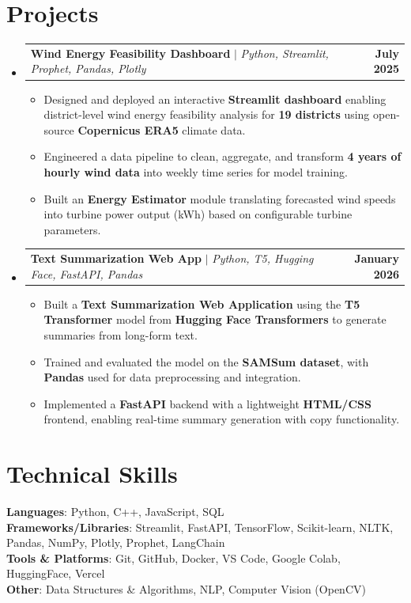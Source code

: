 \documentclass[letterpaper,11pt]{article}
\makeatletter
\newcommand{\resumeItem}[1]{
  \item\small{
    {#1 \vspace{-2pt}}
  }
}
\newcommand{\resumeProjectHeading}[2]{
    \item
    \begin{tabular*}{1.001\textwidth}{l@{\extracolsep{\fill}}r}
      \small#1 & \textbf{\small #2}\\
    \end{tabular*}\vspace{-7pt}
}
\newcommand{\resumeSubHeadingListStart}{\begin{itemize}[leftmargin=0.0in, label={}]}
\newcommand{\resumeSubHeadingListEnd}{\end{itemize}}
\newcommand{\resumeItemListStart}{\begin{itemize}}
\newcommand{\resumeItemListEnd}{\end{itemize}\vspace{-5pt}}
\makeatother
\begin{document}
\section{Projects}
    \vspace{-5pt}
    \resumeSubHeadingListStart
      \resumeProjectHeading
          {\textbf{Wind Energy Feasibility Dashboard} $|$ \emph{Python, Streamlit, Prophet, Pandas, Plotly}}{July 2025}
          \vspace{-6pt}
          \resumeItemListStart
            \resumeItem{Designed and deployed an interactive \textbf{Streamlit dashboard} enabling district-level wind energy feasibility analysis for \textbf{19 districts} using open-source \textbf{Copernicus ERA5} climate data.}
            \resumeItem{Engineered a data pipeline to clean, aggregate, and transform \textbf{4 years of hourly wind data} into weekly time series for model training.}
            \resumeItem{Built an \textbf{Energy Estimator} module translating forecasted wind speeds into turbine power output (kWh) based on configurable turbine parameters.}
          \resumeItemListEnd
          \vspace{-12pt}
      \resumeProjectHeading
          {\textbf{Text Summarization Web App} $|$ \emph{Python, T5, Hugging Face, FastAPI, Pandas}}{January 2026}
          \vspace{-6pt}
          \resumeItemListStart
            \resumeItem{Built a \textbf{Text Summarization Web Application} using the \textbf{T5 Transformer} model from \textbf{Hugging Face Transformers} to generate summaries from long-form text.}
            \resumeItem{Trained and evaluated the model on the \textbf{SAMSum dataset}, with \textbf{Pandas} used for data preprocessing and integration.}
            \resumeItem{Implemented a \textbf{FastAPI} backend with a lightweight \textbf{HTML/CSS} frontend, enabling real-time summary generation with copy functionality.}
          \resumeItemListEnd
          \vspace{-11pt}
          
    \resumeSubHeadingListEnd
\vspace{-8pt}


%
\section{Technical Skills}
 \begin{itemize}[leftmargin=0.15in, label={}]
    \small{\item{
     \textbf{Languages}{: Python, C++, JavaScript, SQL} \\
     \textbf{Frameworks/Libraries}{: Streamlit, FastAPI, TensorFlow, Scikit-learn, NLTK, Pandas, NumPy, Plotly, Prophet, LangChain} \\
     \textbf{Tools \& Platforms}{: Git, GitHub, Docker, VS Code, Google Colab, HuggingFace, Vercel} \\
     \textbf{Other}{: Data Structures \& Algorithms, NLP, Computer Vision (OpenCV)} \\
    }}
 \end{itemize}
 \vspace{-16pt}
\end{document}
